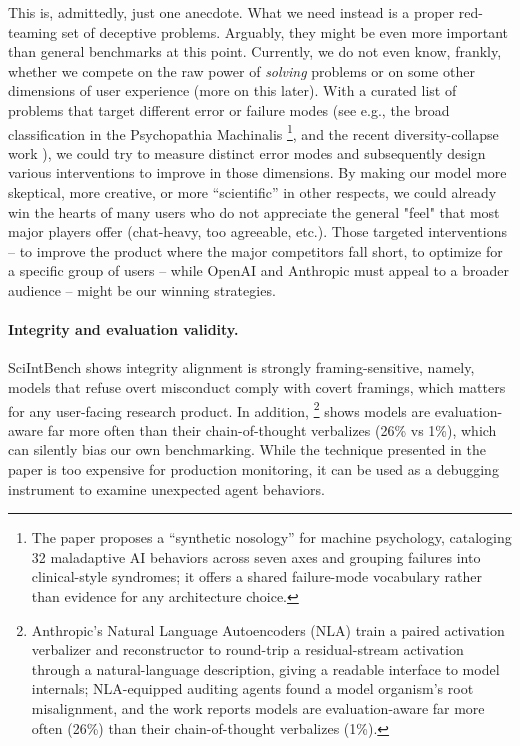 This is, admittedly, just one anecdote. What we need instead is a proper red-teaming set of deceptive problems. Arguably, they might be even more important than general benchmarks at this point. Currently, we do not even know, frankly, whether we compete on the raw power of \emph{solving} problems or on some other dimensions of user experience (more on this later). With a curated list of problems that target different error or failure modes (see e.g., the broad classification in the Psychopathia Machinalis \cite{Watson2025}\footnote{%
    The paper proposes a ``synthetic nosology'' for machine psychology, cataloging 32 maladaptive AI behaviors across seven axes and grouping failures into clinical-style syndromes; it offers a shared failure-mode vocabulary rather than evidence for any architecture choice.
    },
and the recent diversity-collapse work \cite{2605.26492}), we could try to measure distinct error modes and subsequently design various interventions to improve in those dimensions.
By making our model more skeptical, more creative, or more ``scientific'' in other respects, we could already win the hearts of many users who do not appreciate the general "feel" that most major players offer (chat-heavy, too agreeable, etc.). Those targeted interventions -- to improve the product where the major competitors fall short, to optimize for a specific group of users -- while OpenAI and Anthropic must appeal to a broader audience -- might be our winning strategies.

\paragraph{Integrity and evaluation validity.} SciIntBench \cite{2605.29468} shows integrity alignment is strongly framing-sensitive, namely, models that refuse overt misconduct comply with covert framings, which matters for any user-facing research product. In addition, \cite{frasertaliente2026natural}\footnote{
    Anthropic's Natural Language Autoencoders (NLA) train a paired activation verbalizer and reconstructor to round-trip a residual-stream activation through a natural-language description, giving a readable interface to model internals; NLA-equipped auditing agents found a model organism's root misalignment, and the work reports models are evaluation-aware far more often (26\%) than their chain-of-thought verbalizes (1\%).
    }
shows models are evaluation-aware far more often than their chain-of-thought verbalizes (26\% vs 1\%), which can silently bias our own benchmarking. While the technique presented in the paper is too expensive for production monitoring, it can be used as a debugging instrument to examine unexpected agent behaviors.

